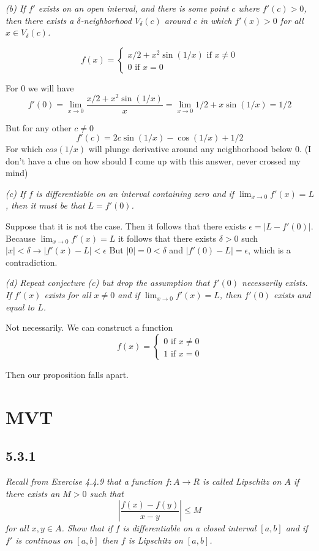 \documentclass[11pt,oneside,titlepage]{book}
\begin{document}
\textit{(b) If $f'$ exists on an open interval, and there is some point $c$
  where $f'(c) > 0$, then there exists a $\delta$-neighborhood
  $V_\delta(c)$ around $c$ in which $f'(x) > 0$ for all
  $x \in V_\delta(c)$.}

\begin{equation}
  f(x) =
  \begin{cases}
    x/2 + x^2 \sin(1/x)\text{ if } x \neq 0 \\
    0 \text{ if } x = 0
  \end{cases}
\end{equation}

For $0$ we will have
$$f'(0) = \lim_{x \to 0} \frac{x/2 + x^2 \sin(1/x)}{x} =
\lim_{x \to 0} 1/2 + x \sin(1/x) = 1/2$$

But for any other $c \neq 0$
$$f'(c) = 2c\sin(1/x) - \cos(1/x) + 1/2$$
For which $cos(1/x)$ will plunge derivative around any neighborhood below 0.
(I don't have a clue on how should I come up with this answer, never crossed
my mind)

\textit{(c) If $f$ is differentiable on an interval containing zero and if
  $\lim_{x \to 0}f'(x) = L$, then it must be that $L = f'(0)$.}

Suppose that it is not the case. Then it follows that there exists
$\epsilon = |L - f'(0)|$. Because $\lim_{x \to 0}f'(x) = L$ it follows that
there exists $\delta > 0$ such 
$|x| < \delta \to |f'(x) - L| < \epsilon$
But $|0| = 0 < \delta$ and $|f'(0) - L| = \epsilon$, which is a contradiction.

\textit{(d) Repeat conjecture (c) but drop the assumption that $f'(0)$
  necessarily exists. If $f'(x)$ exists for all $x \neq 0$ and if
  $\lim_{x \to 0} f'(x) = L$, then $f'(0)$ exists and equal to $L$.}

Not necessarily. We can construct a function
\begin{equation}
  f(x) =
  \begin{cases}
    0 \text{ if } x \neq 0 \\
    1 \text{ if } x = 0
  \end{cases}
\end{equation}

Then our proposition falls apart.

\section{MVT}

\subsection*{5.3.1}
\textit{Recall from Exercise 4.4.9 that a function $f: A \to R$ is called
  Lipschitz on $A$ if there exists an $M > 0$ such that }
$$\left|\frac{f(x) - f(y)}{x - y}\right| \leq M$$
\textit{for all $x, y \in A$. Show that if $f$ is differentiable on a closed
  interval $[a, b]$ and if $f'$ is continous on $[a, b]$ then $f$ is
  Lipschitz on $[a, b]$.}
\end{document}
